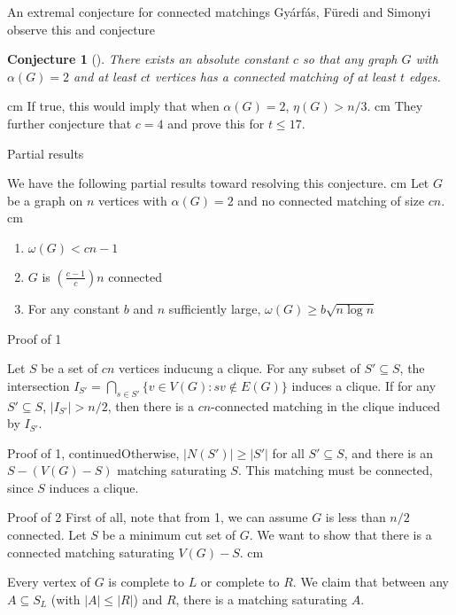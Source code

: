 \documentclass{beamer}
\newtheorem{conjecture}{Conjecture}
\newcommand{\bframe}[2]{\begin{frame}{#1}#2\end{frame}}
\begin{document}
\bframe{An extremal conjecture for connected matchings}{
  Gy\'arf\'as, F\"uredi and Simonyi observe this and conjecture \pause 
 	\begin{conjecture}[\cite{FGS}]
  		There exists an absolute constant $c$ so that any graph $G$ with $\alpha(G) =2$ and at least $ct$ vertices has a connected matching of at least $t$ edges.
 	\end{conjecture}\vskip 0.5 cm\pause
 	If true, this would imply that when $\alpha(G) = 2$, $\eta(G) > n/3$. \pause\vskip 0.5 cm 
 They further conjecture that $c = 4$ and prove this for $t \leq 17$.}

\bframe{Partial results}{

We have the following partial results toward resolving this conjecture.
\pause \vskip 0.5 cm
Let $G$ be a graph on $n$ vertices with $\alpha(G) = 2$ and no connected matching of size $cn$. \pause \vskip 0.25 cm
\begin{enumerate}
	\item $\omega(G) < cn - 1$ \pause
	\item $G$ is $\displaystyle\left( \frac{c-1}{c}\right)n$ connected \pause
	\item For any constant $b$ and $n$ sufficiently large, $\omega(G) \geq b\sqrt{n\log n}$  
\end{enumerate}
}

\bframe{Proof of 1}{
\pause

Let $S$ be a set of $cn$ vertices inducung a clique. \pause For any subset of $S'\subseteq S$, the intersection $\displaystyle I_{S'} = \bigcap_{s\in S'} \{v \in V(G): sv \notin E(G)\}$ induces a clique. \pause If for any $S'\subseteq S$, $|I_{S'}| > n/2$, then there is a $cn$-connected matching in the clique induced by $I_{S'}$. 
}

\bframe{Proof of 1, continued} {Otherwise, $|N(S')| \geq |S'|$ for all $S'\subseteq S$, and there is an $S-(V(G)-S)$ matching saturating $S$. \pause This matching must be connected, since $S$ induces a clique.

}

\bframe{Proof of 2}{
\pause
First of all, note that from 1, we can assume $G$ is less than $n/2$ connected.  \pause
Let $S$ be a minimum cut set of $G$.  \pause We want to show that there is a connected matching saturating $V(G) - S$.\pause\vskip 0.5 cm 

Every vertex of $G$ is complete to $L$ or complete to $R$.  \pause We claim that between any $A \subseteq S_L$ (with $|A| \leq |R|$) and $R$, there is a matching saturating $A$. \pause 

}
\end{document}

